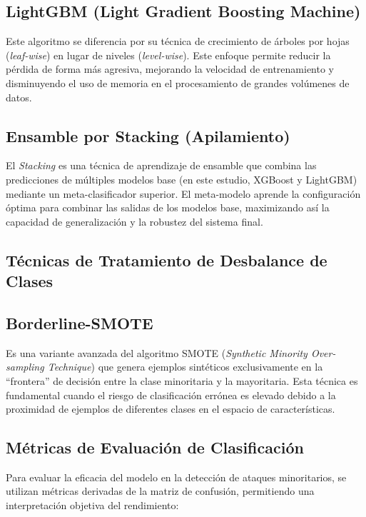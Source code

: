 \subsection{LightGBM (Light Gradient Boosting Machine)}
Este algoritmo se diferencia por su técnica de crecimiento de árboles por hojas (\textit{leaf-wise}) en lugar de niveles (\textit{level-wise}). Este enfoque permite reducir la pérdida de forma más agresiva, mejorando la velocidad de entrenamiento y disminuyendo el uso de memoria en el procesamiento de grandes volúmenes de datos.

\subsection{Ensamble por Stacking (Apilamiento)}
El \textit{Stacking} es una técnica de aprendizaje de ensamble que combina las predicciones de múltiples modelos base (en este estudio, XGBoost y LightGBM) mediante un meta-clasificador superior. El meta-modelo aprende la configuración óptima para combinar las salidas de los modelos base, maximizando así la capacidad de generalización y la robustez del sistema final.

\subsection{Técnicas de Tratamiento de Desbalance de Clases}
\subsection{Borderline-SMOTE}
Es una variante avanzada del algoritmo SMOTE (\textit{Synthetic Minority Over-sampling Technique}) que genera ejemplos sintéticos exclusivamente en la ``frontera'' de decisión entre la clase minoritaria y la mayoritaria. Esta técnica es fundamental cuando el riesgo de clasificación errónea es elevado debido a la proximidad de ejemplos de diferentes clases en el espacio de características.

\subsection{Métricas de Evaluación de Clasificación}
Para evaluar la eficacia del modelo en la detección de ataques minoritarios, se utilizan métricas derivadas de la matriz de confusión, permitiendo una interpretación objetiva del rendimiento:

